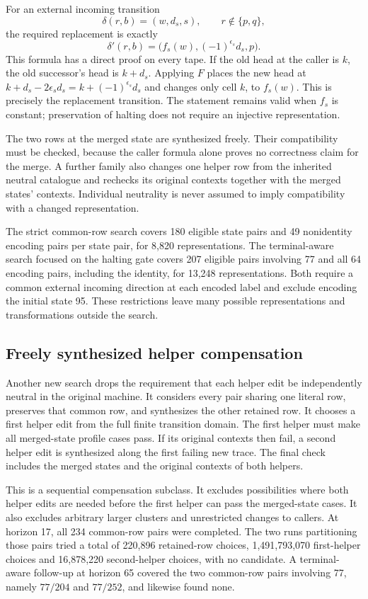 For an external incoming transition
\[
 \delta(r,b)=(w,d_s,s),\qquad r\notin\{p,q\},
\]
the required replacement is exactly
\[
 \delta'(r,b)=\bigl(f_s(w),(-1)^{\epsilon_s}d_s,p\bigr).
\]
This formula has a direct proof on every tape. If the old head at the caller is
$k$, the old successor's head is $k+d_s$. Applying $F$ places the new head at
$k+d_s-2\epsilon_s d_s=k+(-1)^{\epsilon_s}d_s$ and changes only cell $k$, to
$f_s(w)$. This is precisely the replacement transition. The statement remains
valid when $f_s$ is constant; preservation of halting does not require an
injective representation.

The two rows at the merged state are synthesized freely. Their compatibility
must be checked, because the caller formula alone proves no correctness claim
for the merge. A further family also changes one helper row from the inherited
neutral catalogue and rechecks its original contexts together with the merged
states' contexts. Individual neutrality is never assumed to imply compatibility
with a changed representation.

The strict common-row search covers 180 eligible state pairs and 49 nonidentity
encoding pairs per state pair, for 8,820 representations. The terminal-aware
search focused on the halting gate covers 207 eligible pairs involving 77 and
all 64 encoding pairs, including the identity, for 13,248 representations.
Both require a common external incoming direction at each encoded label and
exclude encoding the initial state 95. These restrictions leave many possible
representations and transformations outside the search.

\subsection{Freely synthesized helper compensation}

Another new search drops the requirement that each helper edit be independently
neutral in the original machine. It considers every pair sharing one literal
row, preserves that common row, and synthesizes the other retained row. It
chooses a first helper edit from the full finite transition domain. The first
helper must make all merged-state profile cases pass. If its original contexts
then fail, a second helper edit is synthesized along the first failing new
trace. The final check includes the merged states and the original contexts of
both helpers.

This is a sequential compensation subclass. It excludes possibilities where
both helper edits are needed before the first helper can pass the merged-state
cases. It also excludes arbitrary larger clusters and unrestricted changes to
callers. At horizon 17, all 234 common-row pairs were completed. The two runs
partitioning those pairs tried a total of 220,896 retained-row choices,
1,491,793,070 first-helper choices and 16,878,220 second-helper choices, with no
candidate. A terminal-aware follow-up at horizon 65 covered the two common-row
pairs involving 77, namely $77/204$ and $77/252$, and likewise found none.

